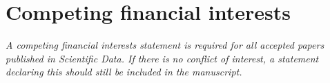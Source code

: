 \section{Competing financial interests}

\textit{A competing financial interests statement is required for all accepted papers published in \textit{Scientific Data}. If there is no conflict of interest, a statement declaring this should still be included in the manuscript.}